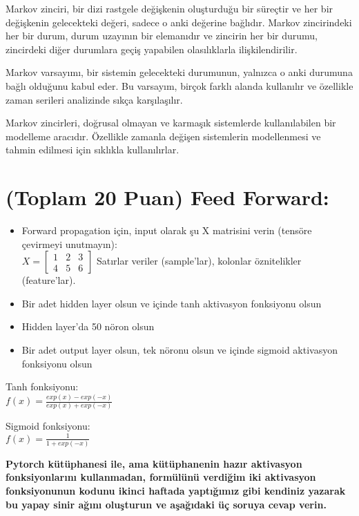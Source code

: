 \documentclass[11pt]{article}
\begin{document}
Markov zinciri, bir dizi rastgele değişkenin oluşturduğu bir süreçtir ve her bir değişkenin gelecekteki değeri, sadece o anki değerine bağlıdır. Markov zincirindeki her bir durum, durum uzayının bir elemanıdır ve zincirin her bir durumu, zincirdeki diğer durumlara geçiş yapabilen olasılıklarla ilişkilendirilir.

Markov varsayımı, bir sistemin gelecekteki durumunun, yalnızca o anki durumuna bağlı olduğunu kabul eder. Bu varsayım, birçok farklı alanda kullanılır ve özellikle zaman serileri analizinde sıkça karşılaşılır.

Markov zincirleri, doğrusal olmayan ve karmaşık sistemlerde kullanılabilen bir modelleme aracıdır. Özellikle zamanla değişen sistemlerin modellenmesi ve tahmin edilmesi için sıklıkla kullanılırlar.

\section{(Toplam 20 Puan) Feed Forward:}
 
\begin{itemize}
    \item Forward propagation için, input olarak şu X matrisini verin (tensöre çevirmeyi unutmayın):\\
    $X = \begin{bmatrix}
        1 & 2 & 3\\
        4 & 5 & 6
        \end{bmatrix}$
    Satırlar veriler (sample'lar), kolonlar öznitelikler (feature'lar).
    \item Bir adet hidden layer olsun ve içinde tanh aktivasyon fonksiyonu olsun
    \item Hidden layer'da 50 nöron olsun
    \item Bir adet output layer olsun, tek nöronu olsun ve içinde sigmoid aktivasyon fonksiyonu olsun
\end{itemize}

Tanh fonksiyonu:\\
$f(x) = \frac{exp(x) - exp(-x)}{exp(x) + exp(-x)}$
\vspace{.2in}

Sigmoid fonksiyonu:\\
$f(x) = \frac{1}{1 + exp(-x)}$

\vspace{.2in}
 \textbf{Pytorch kütüphanesi ile, ama kütüphanenin hazır aktivasyon fonksiyonlarını kullanmadan, formülünü verdiğim iki aktivasyon fonksiyonunun kodunu ikinci haftada yaptığımız gibi kendiniz yazarak bu yapay sinir ağını oluşturun ve aşağıdaki üç soruya cevap verin.}
 
\end{document}
